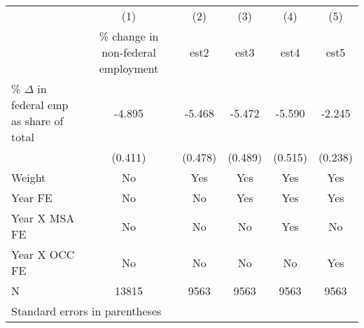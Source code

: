 \begin{tabular}{l*{5}{c}}
\toprule
                    &\multicolumn{1}{c}{(1)}&\multicolumn{1}{c}{(2)}&\multicolumn{1}{c}{(3)}&\multicolumn{1}{c}{(4)}&\multicolumn{1}{c}{(5)}\\
                    &\multicolumn{1}{c}{\% change in non-federal employment}&\multicolumn{1}{c}{est2}&\multicolumn{1}{c}{est3}&\multicolumn{1}{c}{est4}&\multicolumn{1}{c}{est5}\\
\midrule
\% $\Delta$ in federal emp as share of total&      -4.895&      -5.468&      -5.472&      -5.590&      -2.245\\
                    &     (0.411)&     (0.478)&     (0.489)&     (0.515)&     (0.238)\\
\midrule
Weight              &          No&         Yes&         Yes&         Yes&         Yes\\
Year FE             &          No&          No&         Yes&         Yes&         Yes\\
Year X MSA FE       &          No&          No&          No&         Yes&          No\\
Year X OCC FE       &          No&          No&          No&          No&         Yes\\
N                   &       13815&        9563&        9563&        9563&        9563\\
\bottomrule
\multicolumn{6}{l}{\footnotesize Standard errors in parentheses}\\
\end{tabular}
